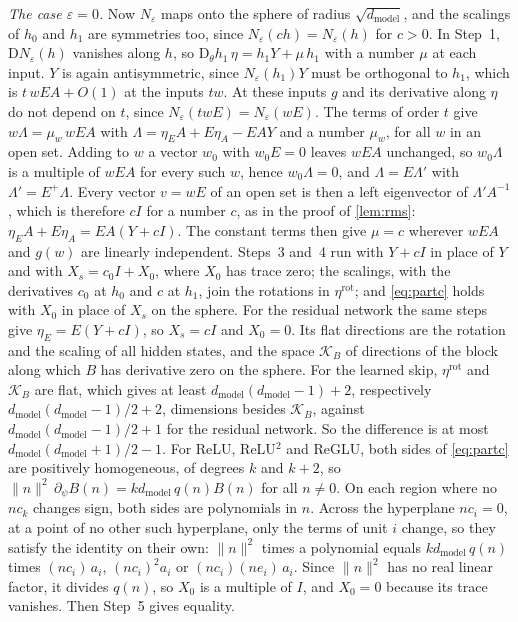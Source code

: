 \documentclass[10pt]{article}
\theoremstyle{definition}
\theoremstyle{remark}
\newcommand{\dm}{d_{\mathrm{model}}}
\newcommand{\Der}{\mathrm{D}}
\newcommand{\norm}[1]{\lVert #1\rVert}
\begin{document}
\emph{The case $\varepsilon = 0$.} Now $N_\varepsilon$ maps onto the sphere of radius $\sqrt{\dm}$, and the scalings of $h_0$ and $h_1$ are symmetries too, since $N_\varepsilon(ch) = N_\varepsilon(h)$ for $c > 0$. In Step~1, $\Der N_\varepsilon(h)$ vanishes along $h$, so $\Der_\theta h_1\,\eta = h_1Y + \mu\,h_1$ with a number $\mu$ at each input. $Y$ is again antisymmetric, since $N_\varepsilon(h_1)Y$ must be orthogonal to $h_1$, which is $t\,wEA + O(1)$ at the inputs $tw$. At these inputs $g$ and its derivative along $\eta$ do not depend on $t$, since $N_\varepsilon(twE) = N_\varepsilon(wE)$. The terms of order $t$ give $w\Lambda = \mu_w\,wEA$ with $\Lambda = \eta_EA + E\eta_A - EAY$ and a number $\mu_w$, for all $w$ in an open set. Adding to $w$ a vector $w_0$ with $w_0E = 0$ leaves $wEA$ unchanged, so $w_0\Lambda$ is a multiple of $wEA$ for every such $w$, hence $w_0\Lambda = 0$, and $\Lambda = E\Lambda'$ with $\Lambda' = E^+\Lambda$. Every vector $v = wE$ of an open set is then a left eigenvector of $\Lambda'A^{-1}$, which is therefore $cI$ for a number $c$, as in the proof of \cref{lem:rms}: $\eta_EA + E\eta_A = EA(Y + cI)$. The constant terms then give $\mu = c$ wherever $wEA$ and $g(w)$ are linearly independent. Steps~3 and~4 run with $Y + cI$ in place of $Y$ and with $X_s = c_0I + X_0$, where $X_0$ has trace zero; the scalings, with the derivatives $c_0$ at $h_0$ and $c$ at $h_1$, join the rotations in $\eta^{\mathrm{rot}}$; and \cref{eq:partc} holds with $X_0$ in place of $X_s$ on the sphere. For the residual network the same steps give $\eta_E = E(Y + cI)$, so $X_s = cI$ and $X_0 = 0$. Its flat directions are the rotation and the scaling of all hidden states, and the space $\mathcal K_B$ of directions of the block along which $B$ has derivative zero on the sphere. For the learned skip, $\eta^{\mathrm{rot}}$ and $\mathcal K_B$ are flat, which gives at least $\dm(\dm-1) + 2$, respectively $\dm(\dm-1)/2 + 2$, dimensions besides $\mathcal K_B$, against $\dm(\dm-1)/2 + 1$ for the residual network. So the difference is at most $\dm(\dm+1)/2 - 1$. For ReLU, ReLU$^2$ and ReGLU, both sides of \cref{eq:partc} are positively homogeneous, of degrees $k$ and $k + 2$, so $\norm{n}^2\,\partial_\psi B(n) = k\dm\,q(n)B(n)$ for all $n \neq 0$. On each region where no $nc_k$ changes sign, both sides are polynomials in $n$. Across the hyperplane $nc_i = 0$, at a point of no other such hyperplane, only the terms of unit $i$ change, so they satisfy the identity on their own: $\norm{n}^2$ times a polynomial equals $k\dm\,q(n)$ times $(nc_i)\,a_i$, $(nc_i)^2a_i$ or $(nc_i)(ne_i)\,a_i$. Since $\norm{n}^2$ has no real linear factor, it divides $q(n)$, so $X_0$ is a multiple of $I$, and $X_0 = 0$ because its trace vanishes. Then Step~5 gives equality.
\end{document}
